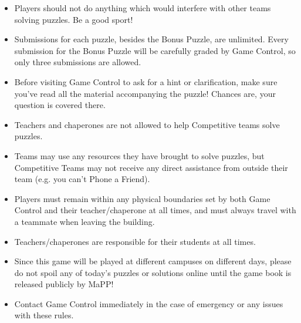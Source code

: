 \begin{itemize}
\item Players should not do anything which
would interfere with other teams solving puzzles. Be a good sport!
\item Submissions for each puzzle, besides the Bonus Puzzle, are unlimited.
Every submission for the Bonus Puzzle will be carefully graded by Game Control,
so only three submissions are allowed.
\item Before visiting Game Control to ask for a hint or clarification, make
sure you've read all the material accompanying the puzzle! Chances are,
your question is covered there.
\item Teachers and chaperones are not allowed to help Competitive teams solve
puzzles.
\item Teams may use any resources they have brought
to solve puzzles, but Competitive Teams may not receive any direct
assistance from outside their team (e.g. you can't Phone a Friend).
\item Players must remain within any physical boundaries set by both
Game Control and their teacher/chaperone at all times, and must always
travel with a teammate when leaving the building.
\item Teachers/chaperones are responsible for their students at
all times.
\item Since this game will be played at different campuses on different
days, please do not spoil any of today's puzzles or solutions online until
the game book is released publicly by MaPP!
\item Contact Game Control immediately in the case of emergency
or any issues with these rules.
\end{itemize}

